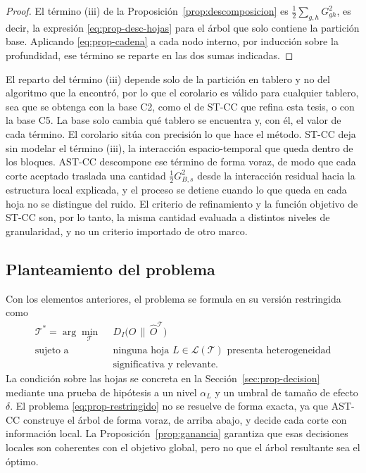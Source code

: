\begin{proof}
El término (iii) de la Proposición~\ref{prop:descomposicion} es
$\tfrac12\sum_{g,h}G^2_{gh}$, es decir, la expresión
\eqref{eq:prop-desc-hojas} para el árbol que solo contiene la partición base.
Aplicando \eqref{eq:prop-cadena} a cada nodo interno, por inducción sobre la
profundidad, ese término se reparte en las dos sumas indicadas.
\end{proof}

El reparto del término (iii) depende solo de la partición en tablero y no del
algoritmo que la encontró, por lo que el corolario es válido para cualquier
tablero, sea que se obtenga con la base C2, como el de ST-CC que refina esta
tesis, o con la base C5. La base solo cambia qué tablero se encuentra y, con él, el valor de cada
término. El corolario sitúa con precisión lo que hace el método. ST-CC deja sin modelar
el término (iii), la interacción espacio-temporal que queda dentro de los
bloques. AST-CC descompone ese término de forma voraz, de modo que cada corte aceptado
traslada una cantidad $\tfrac12 G^2_{B,s}$ desde la interacción residual hacia
la estructura local explicada, y el proceso se detiene cuando lo que queda en
cada hoja no se distingue del ruido. El criterio de refinamiento y la función
objetivo de ST-CC son, por lo tanto, la misma cantidad evaluada a distintos
niveles de granularidad, y no un criterio importado de otro marco.

\subsection{Planteamiento del problema}\label{sec:prop-problema}

Con los elementos anteriores, el problema se formula en su versión restringida
como
\begin{equation}\label{eq:prop-restringido}
  \begin{aligned}
    \mathcal{T}^\ast = \arg\min_{\mathcal{T}}\ \ & D_I\bigl(O\,\|\,\hat O^{\mathcal{T}}\bigr)\\
    \text{sujeto a}\ \ & \text{ninguna hoja } L\in\mathcal{L}(\mathcal{T})
      \text{ presenta heterogeneidad}\\
      & \text{significativa y relevante.}
  \end{aligned}
\end{equation}
La condición sobre las hojas se concreta en la Sección~\ref{sec:prop-decision}
mediante una prueba de hipótesis a un nivel $\alpha_L$ y un umbral de tamaño
de efecto $\delta$. El problema \eqref{eq:prop-restringido} no se resuelve de
forma exacta, ya que AST-CC construye el árbol de forma voraz, de arriba abajo, y
decide cada corte con información local. La Proposición~\ref{prop:ganancia}
garantiza que esas decisiones locales son coherentes con el objetivo global,
pero no que el árbol resultante sea el óptimo.

